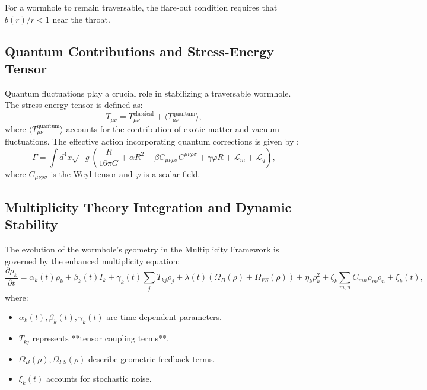 \documentclass{article}
\theoremstyle{plain}
\begin{document}
\begin{itemize}
\begin{itemize}
For a wormhole to remain traversable, the flare-out condition requires that $b(r)/r < 1$ near the throat.

\subsection{Quantum Contributions and Stress-Energy Tensor}

Quantum fluctuations play a crucial role in stabilizing a traversable wormhole. The stress-energy tensor is defined as:
\begin{equation}
T_{\mu\nu} = T_{\mu\nu}^{\text{classical}} + \langle T_{\mu\nu}^{\text{quantum}} \rangle,
\end{equation}
where $\langle T_{\mu\nu}^{\text{quantum}} \rangle$ accounts for the contribution of exotic matter and vacuum fluctuations. The effective action incorporating quantum corrections is given by \cite{hawking1975radiation}:
\begin{equation}
\Gamma = \int d^4x \sqrt{-g} \left( \frac{R}{16\pi G} + \alpha R^2 + \beta C_{\mu\nu\rho\sigma} C^{\mu\nu\rho\sigma} + \gamma \varphi R + \mathcal{L}_m + \mathcal{L}_q \right),
\end{equation}
where $C_{\mu\nu\rho\sigma}$ is the Weyl tensor and $\varphi$ is a scalar field.

\subsection{Multiplicity Theory Integration and Dynamic Stability}

The evolution of the wormhole’s geometry in the Multiplicity Framework is governed by the enhanced multiplicity equation:
\begin{equation}
\frac{\partial \rho_k}{\partial t} = \alpha_k(t) \rho_k + \beta_k(t) I_k + \gamma_k(t) \sum_j T_{kj} \rho_j + \lambda(t) (\Omega_B(\rho) + \Omega_{FS}(\rho)) + \eta_k \rho_k^2 + \zeta_k \sum_{m,n} C_{mn} \rho_m \rho_n + \xi_k(t),
\end{equation}
where:
\begin{itemize}
    \item $\alpha_k(t), \beta_k(t), \gamma_k(t)$ are time-dependent parameters.
    \item $T_{kj}$ represents **tensor coupling terms**.
    \item $\Omega_B(\rho), \Omega_{FS}(\rho)$ describe geometric feedback terms.
    \item $\xi_k(t)$ accounts for stochastic noise.
\end{itemize}


\end{itemize}
\end{itemize}
\end{document}
